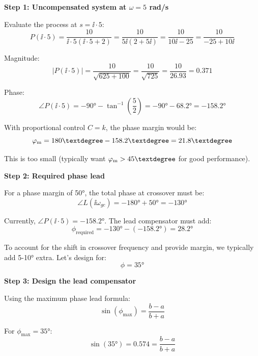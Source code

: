 \documentclass[11pt,a4paper]{article}
\begin{document}
\textbf{Step 1: Uncompensated system at $\omega = 5$ rad/s}

Evaluate the process at $s = \ii \cdot 5$:
\begin{equation}
  P(\ii \cdot 5) = \frac{10}{\ii \cdot 5(\ii \cdot 5 + 2)} = \frac{10}{5\ii(2 + 5\ii)} = \frac{10}{10\ii - 25} = \frac{10}{-25 + 10\ii}
\end{equation}

Magnitude:
\begin{equation}
  |P(\ii \cdot 5)| = \frac{10}{\sqrt{625 + 100}} = \frac{10}{\sqrt{725}} = \frac{10}{26.93} = 0.371
\end{equation}

Phase:
\begin{equation}
  \angle P(\ii \cdot 5) = -90° - \tan^{-1}\left(\frac{5}{2}\right) = -90° - 68.2° = -158.2°
\end{equation}

With proportional control $C = k$, the phase margin would be:
\begin{equation}
  \phasemargin = 180° - 158.2° = 21.8°
\end{equation}

This is too small (typically want $\phasemargin > 45°$ for good performance).

\textbf{Step 2: Required phase lead}

For a phase margin of 50°, the total phase at crossover must be:
\begin{equation}
  \angle L(\ii\omega_{gc}) = -180° + 50° = -130°
\end{equation}

Currently, $\angle P(\ii \cdot 5) = -158.2°$. The lead compensator must add:
\begin{equation}
  \phi_{\text{required}} = -130° - (-158.2°) = 28.2°
\end{equation}

To account for the shift in crossover frequency and provide margin, we typically add 5-10° extra. Let's design for:
\begin{equation}
  \phi = 35°
\end{equation}

\textbf{Step 3: Design the lead compensator}

Using the maximum phase lead formula:
\begin{equation}
  \sin(\phi_{\max}) = \frac{b - a}{b + a}
\end{equation}

For $\phi_{\max} = 35°$:
\begin{equation}
  \sin(35°) = 0.574 = \frac{b - a}{b + a}
\end{equation}
\end{document}
